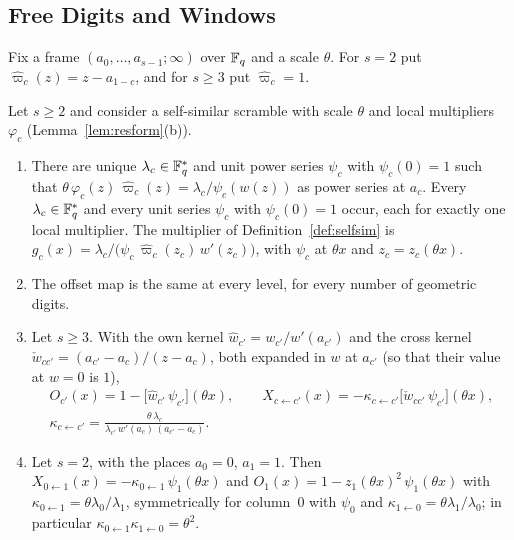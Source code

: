 \subsection{Free Digits and Windows}\label{sec:steer}
Fix a frame $(a_0,\dots,a_{s-1};\infty)$ over $\mathbb{F}_q$ and a scale $\theta$. For $s=2$ put $\hat\varpi_c(z)=z-a_{1-c}$, and for $s\ge3$ put $\hat\varpi_c=1$.

\begin{proposition}\label{prop:LI}
Let $s\ge2$ and consider a self-similar scramble with scale $\theta$ and local multipliers $\varphi_c$ (Lemma~\ref{lem:resform}(b)).
\begin{enumerate}
\item[(a)] There are unique $\lambda_c\in\mathbb{F}_q^*$ and unit power series $\psi_c$ with $\psi_c(0)=1$ such that $\theta\,\varphi_c(z)\,\hat\varpi_c(z)=\lambda_c/\psi_c(w(z))$ as power series at $a_c$. Every $\lambda_c\in\mathbb{F}_q^*$ and every unit series $\psi_c$ with $\psi_c(0)=1$ occur, each for exactly one local multiplier. The multiplier of Definition~\ref{def:selfsim} is $g_c(x)=\lambda_c/\bigl(\psi_c\,\hat\varpi_c(z_c)\,w'(z_c)\bigr)$, with $\psi_c$ at $\theta x$ and $z_c=z_c(\theta x)$.
\item[(b)] The offset map is the same at every level, for every number of geometric digits.
\item[(c)] Let $s\ge3$. With the own kernel $\hat w_{c'}=w_{c'}/w'(a_{c'})$ and the cross kernel $\check w_{cc'}=(a_{c'}-a_c)/(z-a_c)$, both expanded in $w$ at $a_{c'}$ (so that their value at $w=0$ is $1$),
\begin{gather*}
O_{c'}(x)=1-\bigl[\hat w_{c'}\,\psi_{c'}\bigr](\theta x),\qquad X_{c\leftarrow c'}(x)=-\kappa_{c\leftarrow c'}\bigl[\check w_{cc'}\,\psi_{c'}\bigr](\theta x),\\
\kappa_{c\leftarrow c'}=\frac{\theta\,\lambda_c}{\lambda_{c'}\,w'(a_c)\,(a_{c'}-a_c)}.
\end{gather*}
\item[(d)] Let $s=2$, with the places $a_0=0$, $a_1=1$. Then $X_{0\leftarrow1}(x)=-\kappa_{0\leftarrow1}\,\psi_1(\theta x)$ and $O_1(x)=1-z_1(\theta x)^2\,\psi_1(\theta x)$ with $\kappa_{0\leftarrow1}=\theta\lambda_0/\lambda_1$, symmetrically for column~$0$ with $\psi_0$ and $\kappa_{1\leftarrow0}=\theta\lambda_1/\lambda_0$; in particular $\kappa_{0\leftarrow1}\kappa_{1\leftarrow0}=\theta^2$.
\end{enumerate}
\end{proposition}

